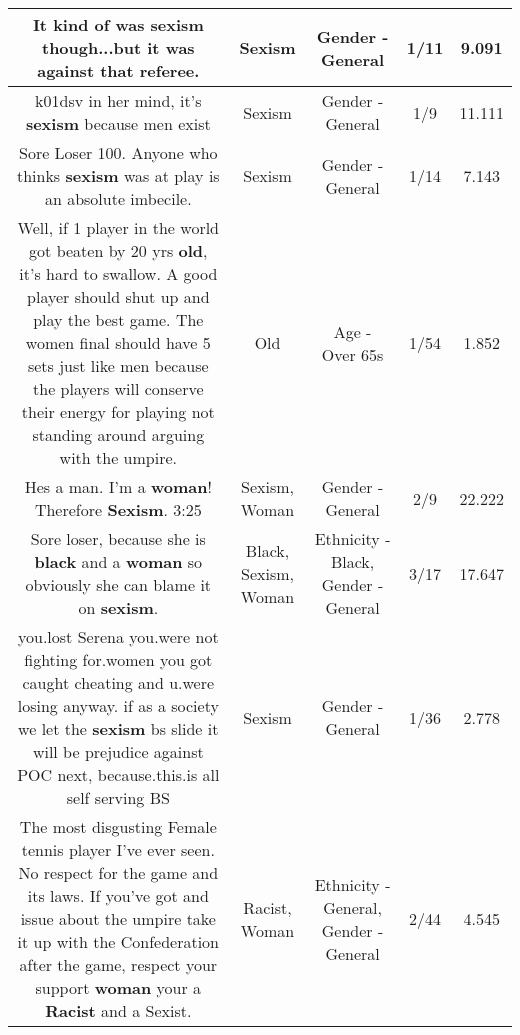 \documentclass[11pt]{article}
\newlength\mylength
\begin{document}
\begin{center}
\begin{longtable}{|C{.65\mylength}|C{.30\mylength}|C{.12\mylength}|C{.12\mylength}|C{.12\mylength}|}
  \small It kind of was \textbf{sexism} though...but it was against that referee.\normalsize   & Sexism & Gender - General & 1/11 & 9.091 \\  \hline
  \small k01dsv in her mind, it's \textbf{sexism} because men exist\normalsize   & Sexism & Gender - General & 1/9 & 11.111 \\  \hline
  \small Sore Loser 100. Anyone who thinks \textbf{sexism} was at play is an absolute imbecile.\normalsize   & Sexism & Gender - General & 1/14 & 7.143 \\  \hline
  \small Well, if 1 player in the world got beaten by 20 yrs \textbf{old}, it's hard to swallow.  A good player should shut up and play the best game.    The women final should have 5 sets just like men because the players will conserve their energy for playing not standing around arguing with the umpire.\normalsize   & Old & Age - Over 65s & 1/54 & 1.852 \\  \hline
  \small Hes a man. I'm a \textbf{woman}! Therefore \textbf{Sexism}. 3:25\normalsize   & Sexism, Woman & Gender - General & 2/9 & 22.222 \\  \hline
  \small Sore loser, because she is \textbf{black} and a \textbf{woman} so obviously she can blame it on \textbf{sexism}.\normalsize   & Black, Sexism, Woman & Ethnicity - Black, Gender - General & 3/17 & 17.647 \\  \hline
  \small you.lost Serena you.were not fighting for.women you got caught cheating and u.were losing anyway. if as a society we let the \textbf{sexism} bs slide it will be prejudice against POC next, because.this.is all self serving BS\normalsize   & Sexism & Gender - General & 1/36 & 2.778 \\  \hline
  \small The most disgusting Female tennis player I've ever seen. No respect for the game and its laws. If you've got and issue about the umpire take it up with the Confederation after the game, respect your support \textbf{woman} your a \textbf{Racist} and a Sexist.\normalsize   & Racist, Woman & Ethnicity - General, Gender - General & 2/44 & 4.545 \\  \hline

\end{longtable}
\end{center}
\end{document}
